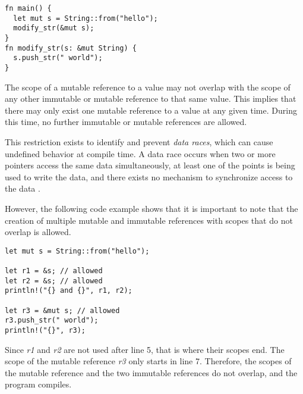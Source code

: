 \documentclass[sigplan,11pt,nonacm]{acmart}
\begin{document}
\begin{lstlisting}
fn main() {
  let mut s = String::from("hello");
  modify_str(&mut s);
}
fn modify_str(s: &mut String) {
  s.push_str(" world");
}
\end{lstlisting}

The scope of a mutable reference to a value may not overlap with the scope of any other immutable or mutable reference to that same value.
This implies that there may only exist one mutable reference to a value at any given time.
During this time, no further immutable or mutable references are allowed.

This restriction exists to identify and prevent \emph{data races}, which can cause undefined behavior at compile time.
A data race occurs when two or more pointers access the same data simultaneously, at least one of the points is being used to write the data, and there exists no mechanism to synchronize access to the data \cite{rust-book}.

However, the following code example \cite{rust-book} shows that it is important to note that the creation of multiple mutable and immutable references with scopes that do not overlap is allowed.

\begin{lstlisting}
let mut s = String::from("hello");

let r1 = &s; // allowed
let r2 = &s; // allowed
println!("{} and {}", r1, r2);

let r3 = &mut s; // allowed
r3.push_str(" world");
println!("{}", r3);
\end{lstlisting}

Since \emph{r1} and \emph{r2} are not used after line 5, that is where their scopes end.
The scope of the mutable reference \emph{r3} only starts in line 7.
Therefore, the scopes of the mutable reference and the two immutable references do not overlap, and the program compiles.





\end{document}
